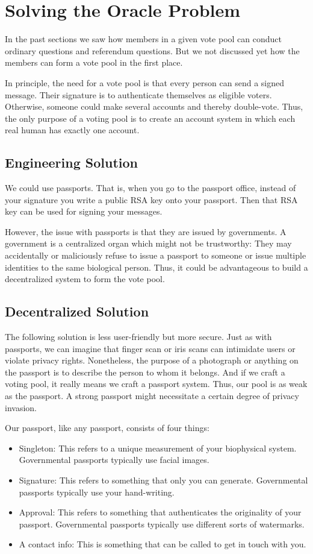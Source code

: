 \documentclass{article}
\theoremstyle{definition}
\begin{document}
	\section{Solving the Oracle Problem}
	In the past sections we saw how members in a given vote pool can conduct ordinary questions and referendum questions. But we not discussed yet how the members can form a vote pool in the first place.
	
	In principle, the need for a vote pool is that every person can send a signed message. Their signature is to authenticate themselves as eligible voters. Otherwise, someone could make several accounts and thereby double-vote.
	Thus, the only purpose of a voting pool is to create an account system in which each real human has exactly one account.
	
	\subsection{Engineering Solution}
	We could use passports. That is, when you go to the passport office, instead of your signature you write a public RSA key onto your passport. Then that RSA key can be used for signing your messages.
	
	However, the issue with passports is that they are issued by governments. A government is a centralized organ which might not be trustworthy: They may accidentally or maliciously refuse to issue a passport to someone or issue multiple identities to the same biological person. Thus, it could be advantageous to build a decentralized system to form the vote pool.
	
	\subsection{Decentralized Solution}
	The following solution is less user-friendly but more secure. Just as with passports, we can imagine that finger scan or iris scans can intimidate users or violate privacy rights. Nonetheless, the purpose of a photograph or anything on the passport is to describe the person to whom it belongs. And if we craft a voting pool, it really means we craft a passport system. Thus, our pool is as weak as the passport. A strong passport might necessitate a certain degree of privacy invasion.
	
	Our passport, like any passport, consists of four things:
	\begin{itemize}
		\item Singleton: This refers to a unique measurement of your biophysical system. Governmental passports typically use facial images.
		\item Signature: This refers to something that only you can generate. Governmental passports typically use your hand-writing.
		\item Approval: This refers to something that authenticates the originality of your passport. Governmental passports typically use different sorts of watermarks.
		\item A contact info: This is something that can be called to get in touch with you.
	\end{itemize}
	
\end{document}
